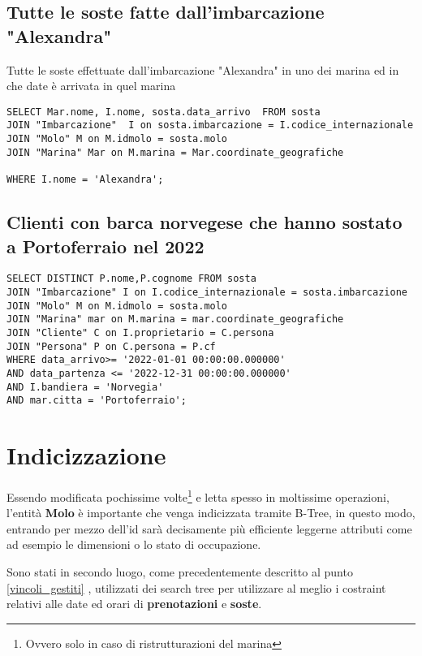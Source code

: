\subsection{Tutte le soste fatte dall'imbarcazione "Alexandra"}

Tutte le soste effettuate dall'imbarcazione "Alexandra" in uno dei marina ed in che date è arrivata in quel marina

\begin{lstlisting}
SELECT Mar.nome, I.nome, sosta.data_arrivo  FROM sosta
JOIN "Imbarcazione"  I on sosta.imbarcazione = I.codice_internazionale
JOIN "Molo" M on M.idmolo = sosta.molo
JOIN "Marina" Mar on M.marina = Mar.coordinate_geografiche

WHERE I.nome = 'Alexandra';
\end{lstlisting}

\subsection{Clienti con barca norvegese che hanno sostato a Portoferraio nel 2022}

\begin{lstlisting}
SELECT DISTINCT P.nome,P.cognome FROM sosta
JOIN "Imbarcazione" I on I.codice_internazionale = sosta.imbarcazione
JOIN "Molo" M on M.idmolo = sosta.molo
JOIN "Marina" mar on M.marina = mar.coordinate_geografiche
JOIN "Cliente" C on I.proprietario = C.persona
JOIN "Persona" P on C.persona = P.cf
WHERE data_arrivo>= '2022-01-01 00:00:00.000000'
AND data_partenza <= '2022-12-31 00:00:00.000000'
AND I.bandiera = 'Norvegia'
AND mar.citta = 'Portoferraio';
\end{lstlisting}

\section{Indicizzazione}

Essendo modificata pochissime volte\footnote{Ovvero solo in caso di ristrutturazioni del marina} e letta spesso in moltissime operazioni, l'entità \textbf{Molo} è importante che venga indicizzata tramite B-Tree, in questo modo, entrando per mezzo dell'id sarà decisamente più efficiente leggerne attributi come ad esempio le dimensioni o lo stato di occupazione.

Sono stati in secondo luogo, come precedentemente descritto al punto \ref{vincoli_gestiti} , utilizzati dei search tree per utilizzare al meglio i costraint relativi alle date ed orari di \textbf{prenotazioni} e \textbf{soste}.
